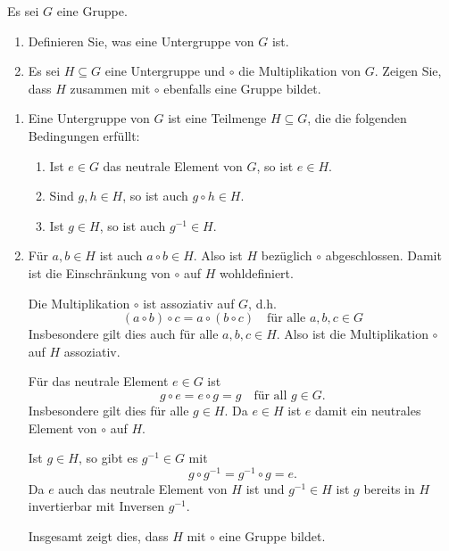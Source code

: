 \begin{question}
 Es sei $G$ eine Gruppe.
 \begin{enumerate}
  \item
   Definieren Sie, was eine Untergruppe von $G$ ist.
  \item
   Es sei $H \subseteq G$ eine Untergruppe und $\circ$ die Multiplikation von $G$. Zeigen Sie, dass $H$ zusammen mit $\circ$ ebenfalls eine Gruppe bildet.
 \end{enumerate}
\end{question}
\begin{solution}
 \begin{enumerate}
  \item
   Eine Untergruppe von $G$ ist eine Teilmenge $H \subseteq G$, die die folgenden Bedingungen erfüllt:
   \begin{enumerate}
    \item
     Ist $e \in G$ das neutrale Element von $G$, so ist $e \in H$.
    \item
     Sind $g, h \in H$, so ist auch $g \circ h \in H$.
    \item
     Ist $g \in H$, so ist auch $g^{-1} \in H$.
   \end{enumerate}
  \item
   Für $a, b \in H$ ist auch $a \circ b \in H$. Also ist $H$ bezüglich $\circ$ abgeschlossen. Damit ist die Einschränkung von $\circ$ auf $H$ wohldefiniert.
   
   Die Multiplikation $\circ$ ist assoziativ auf $G$, d.h.
   \[
    (a \circ b) \circ c = a \circ (b \circ c)
    \quad \text{für alle $a,b,c \in G$}
   \]
   Insbesondere gilt dies auch für alle $a,b,c \in H$. Also ist die Multiplikation $\circ$ auf $H$ assoziativ.
   
   Für das neutrale Element $e \in G$ ist
   \[
    g \circ e = e \circ g = g \quad \text{für all $g \in G$}.
   \]
   Insbesondere gilt dies für alle $g \in H$. Da $e \in H$ ist $e$ damit ein neutrales Element von $\circ$ auf $H$.
   
   Ist $g \in H$, so gibt es $g^{-1} \in G$ mit
   \[
    g \circ g^{-1} = g^{-1} \circ g = e.
   \]
   Da $e$ auch das neutrale Element von $H$ ist und $g^{-1} \in H$ ist $g$ bereits in $H$ invertierbar mit Inversen $g^{-1}$.
   
   Insgesamt zeigt dies, dass $H$ mit $\circ$ eine Gruppe bildet.
 \end{enumerate}
\end{solution}




